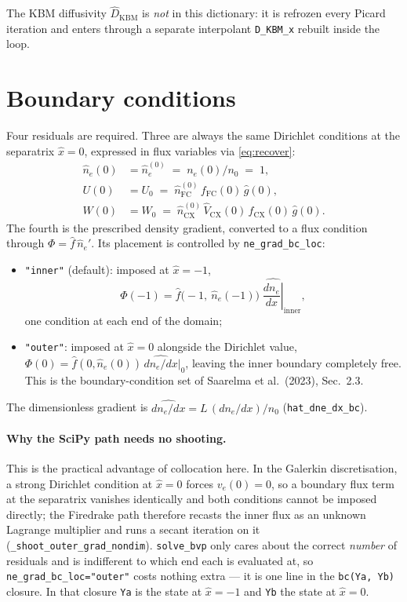 \documentclass[11pt]{article}
\newcommand{\hn}{\hat{n}}
\newcommand{\hx}{\hat{x}}
\newcommand{\hg}{\hat{g}}
\newcommand{\hV}{\hat{V}}
\newcommand{\hD}{\hat{D}}
\newcommand{\hf}{\hat{f}}
\newcommand{\code}[1]{\texttt{#1}}
\begin{document}
The KBM diffusivity $\hD_{\mathrm{KBM}}$ is \emph{not} in this
dictionary: it is refrozen every Picard iteration and enters through a
separate interpolant \code{D\_KBM\_x} rebuilt inside the loop.

\section{Boundary conditions}
\label{sec:bcs}

Four residuals are required.  Three are always the same Dirichlet
conditions at the separatrix $\hx = 0$, expressed in flux variables via
\eqref{eq:recover}:
\begin{align}
  \hn_e(0) &= \hn_e^{(0)} \;=\; n_e(0)/n_0 \;=\; 1, \\
  U(0)     &= U_0 \;=\; \hn_{\mathrm{FC}}^{(0)}\,
                 f_{\mathrm{FC}}(0)\,\hg(0), \\
  W(0)     &= W_0 \;=\; \hn_{\mathrm{CX}}^{(0)}\,
                 \hV_{\mathrm{CX}}(0)\,f_{\mathrm{CX}}(0)\,\hg(0).
\end{align}
The fourth is the prescribed density gradient, converted to a flux
condition through $\Phi = \hf\,\hn_e'$.  Its placement is controlled by
\code{ne\_grad\_bc\_loc}:
\begin{itemize}
  \item \code{"inner"} (default): imposed at $\hx = -1$,
        \[
          \Phi(-1) = \hf\bigl(-1,\ \hn_e(-1)\bigr)\;
          \widehat{\left.\frac{dn_e}{dx}\right|}_{\mathrm{inner}} ,
        \]
        one condition at each end of the domain;
  \item \code{"outer"}: imposed at $\hx = 0$ alongside the Dirichlet
        value, $\Phi(0) = \hf(0, \hn_e(0))\,\widehat{dn_e/dx}|_{0}$,
        leaving the inner boundary completely free.  This is the
        boundary-condition set of Saarelma et al.~(2023), Sec.~2.3.
\end{itemize}
The dimensionless gradient is $\widehat{dn_e/dx} = L\,(dn_e/dx)/n_0$
(\code{hat\_dne\_dx\_bc}).

\paragraph{Why the SciPy path needs no shooting.}
This is the practical advantage of collocation here.  In the Galerkin
discretisation, a strong Dirichlet condition at $\hx = 0$ forces
$v_e(0) = 0$, so a boundary flux term at the separatrix vanishes
identically and both conditions cannot be imposed directly; the Firedrake
path therefore recasts the inner flux as an unknown Lagrange multiplier
and runs a secant iteration on it (\code{\_shoot\_outer\_grad\_nondim}).
\code{solve\_bvp} only cares about the correct \emph{number} of residuals
and is indifferent to which end each is evaluated at, so
\code{ne\_grad\_bc\_loc="outer"} costs nothing extra --- it is one line in
the \code{bc(Ya, Yb)} closure.  In that closure \code{Ya} is the state at
$\hx=-1$ and \code{Yb} the state at $\hx=0$.
\end{document}
